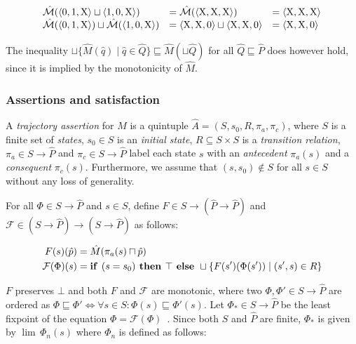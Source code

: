 \begin{equation*}
\begin{array}{lll}
  \hat{\mathcal{M}}(\langle 0, 1, \mathrm{X} \rangle \sqcup \langle 1, 0, \mathrm{X} \rangle) &= \hat{\mathcal{M}}(\langle \mathrm{X}, \mathrm{X}, \mathrm{X} \rangle) &= \langle \mathrm{X}, \mathrm{X}, \mathrm{X} \rangle \\
  \hat{\mathcal{M}}(\langle 0, 1, \mathrm{X} \rangle) \sqcup \hat{\mathcal{M}}(\langle 1, 0, \mathrm{X} \rangle) &= \langle \mathrm{X}, \mathrm{X}, 0 \rangle \sqcup \langle \mathrm{X}, \mathrm{X}, 0 \rangle &= \langle \mathrm{X}, \mathrm{X}, 0 \rangle
\end{array}
\end{equation*}

\noindent The inequality $\sqcup \{ \hat M(\hat q) \mid \hat q \in \hat Q \} \sqsubseteq \hat M(\sqcup \hat Q)$ for all $\hat Q \sqsubseteq \hat P$ does however hold, since it is implied by the monotonicity of $\hat M$.

\subsubsection{Assertions and satisfaction}

A \textit{trajectory assertion} for $\hat M$ is a quintuple $\hat A = (S,s_{0},R,\pi_{a},\pi_{c})$, where $S$ is a finite set of \textit{states}, $s_{0} \in S$ is an \textit{initial state}, $R \subseteq S \times S$ is a \textit{transition relation}, $\pi_{a} \in S \rightarrow \hat P$ and $\pi_{c} \in S \rightarrow \hat P$ label each state $s$ with an \textit{antecedent} $\pi_{a}(s)$ and a \textit{consequent} $\pi_{c}(s)$. Furthermore, we assume that $(s,s_{0}) \notin S$ for all $s \in S$ without any loss of generality.

For all $\Phi \in S \rightarrow \hat P$ and $s \in S$, define $F \in S \rightarrow (\hat P \rightarrow \hat P)$ and $\mathcal{F} \in (S \rightarrow \hat P) \rightarrow (S \rightarrow \hat P)$ as follows:

\begin{align}
F(s)(\hat p) &= \hat M(\pi_{a}(s) \sqcap \hat p) \\
\mathcal{F}(\Phi)(s) &= \textrm{\textbf{if }} (s = s_{0}) \textrm{\textbf{ then }} \top \textrm{\textbf{ else }} \sqcup \{ F(s')(\Phi(s')) \mid (s',s) \in R \}
\end{align}

\noindent $F$ preserves $\bot$ and both $F$ and $\mathcal{F}$ are monotonic, where two $\Phi, \Phi' \in S \rightarrow \hat P$ are ordered as $\Phi \sqsubseteq \Phi' \iff \forall s \in S : \Phi(s) \sqsubseteq \Phi'(s)$. Let $\Phi_{*} \in S \rightarrow \hat P$ be the least fixpoint of the equation $\Phi = \mathcal{F}(\Phi)$~\cite{davey2002}. Since both $S$ and $\hat P$ are finite, $\Phi_{*}$ is given by $\lim \, \Phi_{n}(s)$ where $\Phi_{n}$ is defined as follows:

